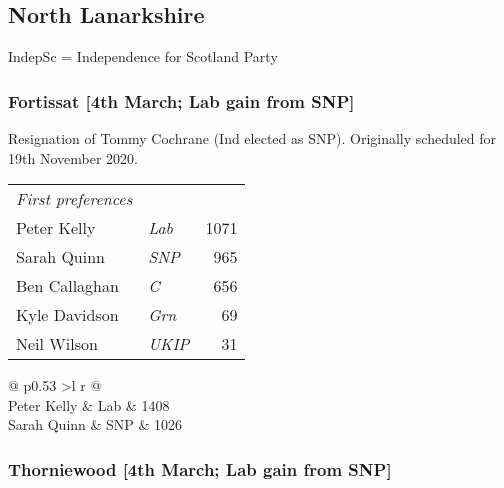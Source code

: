 \documentclass[a4paper,openany]{book}
\begin{document}
\begin{resultsiii}
\subsection*{North Lanarkshire}

IndepSc = Independence for Scotland Party

\subsubsection*{Fortissat \hspace*{\fill}\nolinebreak[1]%
	\enspace\hspace*{\fill}
	[4th March; Lab gain from SNP]}


Resignation of Tommy Cochrane (Ind elected as SNP).  Originally scheduled for 19th November 2020.

\noindent
\begin{tabular*}{\columnwidth}{@{\extracolsep{\fill}} p{} >{\itshape}l r @{\extracolsep{\fill}}}
	\emph{First preferences}\\
	Peter Kelly & Lab & 1071\\
	Sarah Quinn & SNP & 965\\
	Ben Callaghan & C & 656\\
	Kyle Davidson & Grn & 69\\
	Neil Wilson & UKIP & 31\\
\end{tabular*}

\noindent
\begin{tabular*}{\columnwidth}{@{\extracolsep{\fill}} p{} >{\itshape}l r @{\extracolsep{\fill}}}
\\
	Peter Kelly & Lab & 1408\\
	Sarah Quinn & SNP & 1026\\
\end{tabular*}

\subsubsection*{Thorniewood \hspace*{\fill}\nolinebreak[1]%
	\enspace\hspace*{\fill}
	[4th March; Lab gain from SNP]}


\end{resultsiii}
\end{document}
